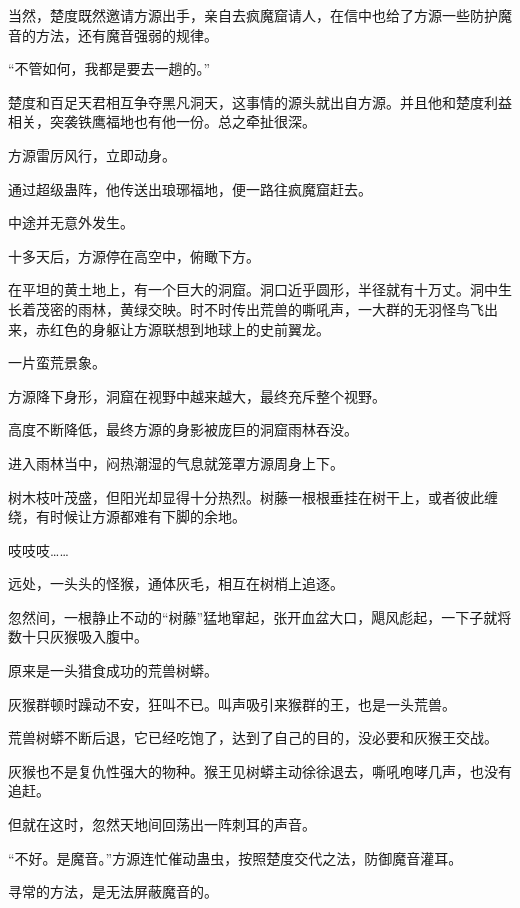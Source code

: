 
\begin{this_body}



当然，楚度既然邀请方源出手，亲自去疯魔窟请人，在信中也给了方源一些防护魔音的方法，还有魔音强弱的规律。

“不管如何，我都是要去一趟的。”

楚度和百足天君相互争夺黑凡洞天，这事情的源头就出自方源。并且他和楚度利益相关，突袭铁鹰福地也有他一份。总之牵扯很深。

方源雷厉风行，立即动身。

通过超级蛊阵，他传送出琅琊福地，便一路往疯魔窟赶去。

中途并无意外发生。

十多天后，方源停在高空中，俯瞰下方。

在平坦的黄土地上，有一个巨大的洞窟。洞口近乎圆形，半径就有十万丈。洞中生长着茂密的雨林，黄绿交映。时不时传出荒兽的嘶吼声，一大群的无羽怪鸟飞出来，赤红色的身躯让方源联想到地球上的史前翼龙。

一片蛮荒景象。

方源降下身形，洞窟在视野中越来越大，最终充斥整个视野。

高度不断降低，最终方源的身影被庞巨的洞窟雨林吞没。

进入雨林当中，闷热潮湿的气息就笼罩方源周身上下。

树木枝叶茂盛，但阳光却显得十分热烈。树藤一根根垂挂在树干上，或者彼此缠绕，有时候让方源都难有下脚的余地。

吱吱吱……

远处，一头头的怪猴，通体灰毛，相互在树梢上追逐。

忽然间，一根静止不动的“树藤”猛地窜起，张开血盆大口，飓风彪起，一下子就将数十只灰猴吸入腹中。

原来是一头猎食成功的荒兽树蟒。

灰猴群顿时躁动不安，狂叫不已。叫声吸引来猴群的王，也是一头荒兽。

荒兽树蟒不断后退，它已经吃饱了，达到了自己的目的，没必要和灰猴王交战。

灰猴也不是复仇性强大的物种。猴王见树蟒主动徐徐退去，嘶吼咆哮几声，也没有追赶。

但就在这时，忽然天地间回荡出一阵刺耳的声音。

“不好。是魔音。”方源连忙催动蛊虫，按照楚度交代之法，防御魔音灌耳。

寻常的方法，是无法屏蔽魔音的。


\end{this_body}
